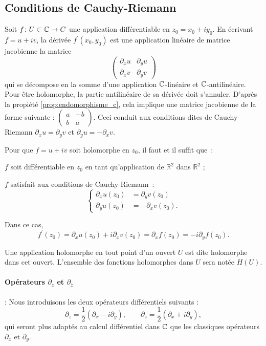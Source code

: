 \subsection{Conditions de Cauchy-Riemann}
Soit $f \colon U \subset \mathbb{C} \to C$ une application différentiable en $z_0=x_0 +i y_0$. En écrivant $f=u + i v$, la dérivée $f^\prime (x_0,y_0)$ est une application linéaire de matrice jacobienne la matrice
\[\begin{pmatrix} \partial_x u &  \partial_y u \\ \partial_x v &  \partial_y v \end{pmatrix} \]
qui se décompose en la somme d'une application $\mathbb{C}$-linéaire et $\mathbb{C}$-antilinéaire. Pour être holomorphe, la partie antilinéaire de sa dérivée doit s'annuler. D'après la propiété \ref{prop:endomorphisme_c}, cela implique une matrice jacobienne de la forme suivante : $\begin{pmatrix} a &  -b  \\ b &  a \end{pmatrix}$. Ceci conduit aux conditions dites de Cauchy-Riemann $\partial_x u=\partial_y v$ et $\partial_y u=-\partial_x v$.

\begin{fprop}\label{prop:hol_1}
Pour que $f=u + i v$ soit holomorphe en $z_0$, il faut et il suffit que~:
\begin{MYenumerate}
\item $f$ soit différentiable en $z_0$ en tant qu'application de $\mathbb{R}^2$ dans $\mathbb{R}^2$ ;
\item $f$ satisfait aux conditions de Cauchy-Riemann~:
\[\begin{cases}
\partial_x u(z_0) &= \partial_y v(z_0)  \\
\partial_y u(z_0) &= - \partial_x v(z_0).
\end{cases}\]
\end{MYenumerate}
Dans ce cas, 
\[f^\prime(z_0)=\partial_x u(z_0) + i \partial_x v(z_0) = \partial_x f(z_0)=-i \partial_y f(z_0).  \]
\end{fprop}

\begin{fdefn}
Une application holomorphe en tout point d'un ouvert $U$ est dite holomorphe dans cet ouvert. L'ensemble des fonctions holomorphes dans $U$ sera notée $H(U)$.
\end{fdefn}


\paragraph{Opérateurs $\partial_z$ et $\partial_{\bar{z}}$} :  Nous introduisons les deux opérateurs différentiels suivants :
\[\partial_z = \frac{1}{2} \left(\partial_x -i \partial_y \right), \qquad \partial_{\bar{z}} = \frac{1}{2} \left(\partial_x + i \partial_y \right),\]
qui seront plus adaptés au calcul différentiel dans $\mathbb{C}$ que les classiques opérateurs $\partial_x$ et $\partial_y$. 

